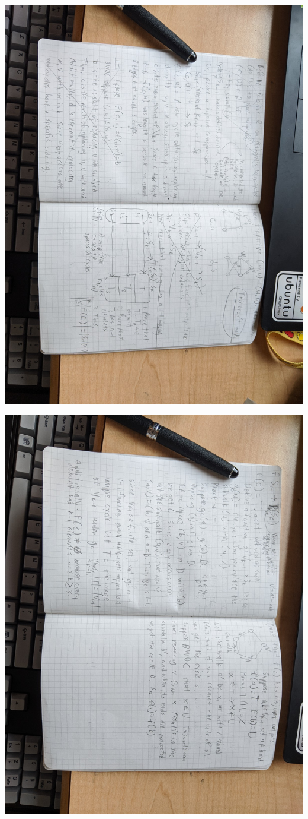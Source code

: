 \documentclass{article}
\begin{document}
\begin{landscape}
    \pagebreak
    
    \centering
    \thispagestyle{empty}
    \includegraphics[angle=90, width=0.9\linewidth]{mt/3.jpg}

    \pagebreak
    
    \centering
    \thispagestyle{empty}
    \includegraphics[angle=90, width=0.9\linewidth]{mt/4.jpg}


\end{landscape}
\end{document}

